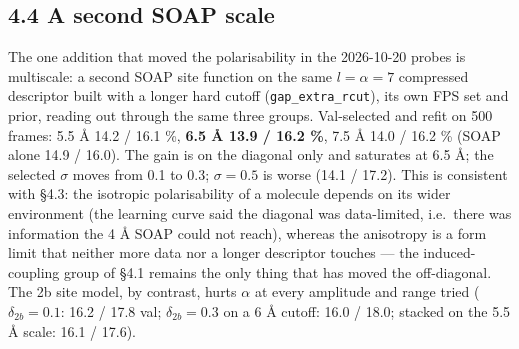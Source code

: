 \documentclass[11pt,a4paper]{article}
\begin{document}
\subsection{4.4 A second SOAP scale}\label{a-second-soap-scale}

The one addition that moved the polarisability in the 2026-10-20 probes is multiscale: a second SOAP
site function on the same \(l=\alpha=7\) compressed descriptor built with a longer hard cutoff
(\texttt{gap\_extra\_rcut}), its own FPS set and prior, reading out through the same three groups.
Val-selected and refit on 500 frames: 5.5 \AA{} 14.2 / 16.1 \%, \textbf{6.5 \AA{} 13.9 / 16.2 \%},
7.5 \AA{} 14.0 / 16.2 \% (SOAP alone 14.9 / 16.0). The gain is on the diagonal only and saturates at
6.5 \AA{}; the selected \(\sigma\) moves from 0.1 to 0.3; \(\sigma=0.5\) is worse (14.1 / 17.2).
This is consistent with §4.3: the isotropic polarisability of a molecule depends on its wider
environment (the learning curve said the diagonal was data-limited, i.e.~there was information the 4
\AA{} SOAP could not reach), whereas the anisotropy is a form limit that neither more data nor a
longer descriptor touches --- the induced-coupling group of §4.1 remains the only thing that has
moved the off-diagonal. The 2b site model, by contrast, hurts \(\alpha\) at every amplitude and
range tried (\(\delta_{2b}=0.1\): 16.2 / 17.8 val; \(\delta_{2b}=0.3\) on a 6 \AA{} cutoff: 16.0 /
18.0; stacked on the 5.5 \AA{} scale: 16.1 / 17.6).
\end{document}
